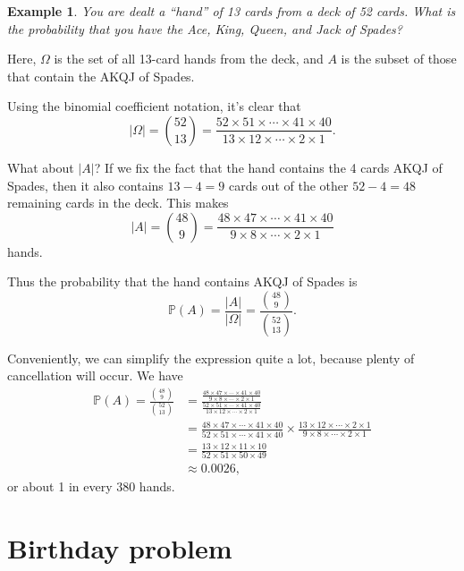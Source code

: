 \documentclass[
  a4paper,
]{book}
\theoremstyle{definition}
\theoremstyle{definition}
\newtheorem{example}{Example}[chapter]
\theoremstyle{definition}
\theoremstyle{definition}
\theoremstyle{remark}
\begin{document}
\begin{example}
\protect\hypertarget{exm:akqj}{}\label{exm:akqj}\emph{You are dealt a ``hand'' of 13 cards from a deck of 52 cards. What is the probability that you have the Ace, King, Queen, and Jack of Spades?}

Here, \(\Omega\) is the set of all 13-card hands from the deck, and \(A\) is the subset of those that contain the AKQJ of Spades.

Using the binomial coefficient notation, it's clear that
\[ |\Omega| = \binom{52}{13} = \frac{52\times51\times\cdots\times41\times40}{13\times12\times\cdots\times2\times1} . \]

What about \(|A|\)? If we fix the fact that the hand contains the 4 cards AKQJ of Spades, then it also contains \(13-4=9\) cards out of the other \(52-4 = 48\) remaining cards in the deck. This makes
\[ |A| = \binom{48}{9} = \frac{48\times47\times\cdots\times41\times40}{9\times8\times\cdots\times2\times1}\]
hands.

Thus the probability that the hand contains AKQJ of Spades is
\[ \mathbb P(A) = \frac{|A|}{|\Omega|} = \frac{\binom{48}{9}}{\binom{52}{13}} . \]

Conveniently, we can simplify the expression quite a lot, because plenty of cancellation will occur. We have
\begin{align*}
\mathbb P(A) = \frac{\binom{48}{9}}{\binom{52}{13}}
  &= \frac{\frac{48\times47\times\cdots\times41\times40}{9\times8\times\cdots\times2\times1}}{\frac{52\times51\times\cdots\times41\times40}{13\times12\times\cdots\times2\times1}} \\
  &= \frac{48\times47\times\cdots\times41\times40}{52\times51\times\cdots\times41\times40} \times \frac{13\times12\times\cdots\times2\times1}{9\times8\times\cdots\times2\times1} \\
  &= \frac{13\times12\times11\times10}{52\times51\times50\times49} \\
  &\approx 0.0026 ,
\end{align*}
or about 1 in every 380 hands.
\end{example}

\hypertarget{birthday}{%
\section{Birthday problem}\label{birthday}}
\end{document}

